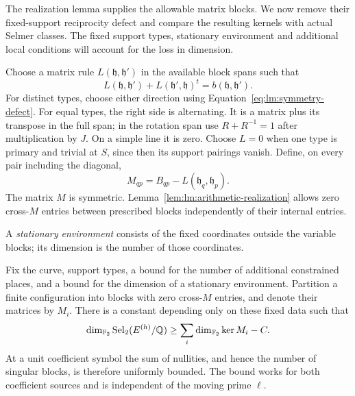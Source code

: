 The realization lemma supplies the allowable matrix blocks. We now remove
their fixed-support reciprocity defect and compare the resulting kernels
with actual Selmer classes. The fixed support types, stationary
environment and additional local conditions will account for the loss
in dimension.

Choose a matrix rule $L(\mathfrak h,\mathfrak h')$ in the available
block spans such that
\begin{equation}\label{eq:lm:type-correction}
 L(\mathfrak h,\mathfrak h')+
 L(\mathfrak h',\mathfrak h)^t=b(\mathfrak h,\mathfrak h').
\end{equation}
For distinct types, choose either direction using
Equation~\eqref{eq:lm:symmetry-defect}. For equal types, the right
side is alternating. It is a matrix plus its transpose in the full
span; in the rotation span use $R+R^{-1}=1$ after multiplication by
$J$. On a simple line it is zero. Choose $L=0$ when one type is
primary and trivial at $S$, since then its support pairings vanish.
Define, on every pair including the diagonal,
\[
 M_{qp}=B_{qp}-L(\mathfrak h_q,\mathfrak h_p).
\]
The matrix $M$ is symmetric. Lemma~\ref{lem:lm:arithmetic-realization}
allows zero cross-$M$ entries between prescribed blocks independently
of their internal entries.

A \emph{stationary environment} consists of the fixed coordinates
outside the variable blocks; its dimension is the number of those
coordinates.

\begin{proposition}
\label{prop:selmer-matrix-bound}
Fix the curve, support types, a bound for the number of additional
constrained places, and a bound for the dimension of a stationary
environment. Partition a finite configuration into blocks with zero
cross-$M$ entries, and denote their matrices by $M_i$. There is a
constant depending only on these fixed data such that
\begin{equation}\label{eq:lm:selmer-nullity}
 \dim_{\mathbb F_2}\operatorname{Sel}_2(E^{(h)}/\mathbb Q)
 \geq\sum_i\dim_{\mathbb F_2}\ker M_i-C.
\end{equation}
At a unit coefficient symbol the sum of nullities, and hence the
number of singular blocks, is therefore uniformly bounded. The bound
works for both coefficient sources and is independent of the moving
prime $\ell$.
\end{proposition}

